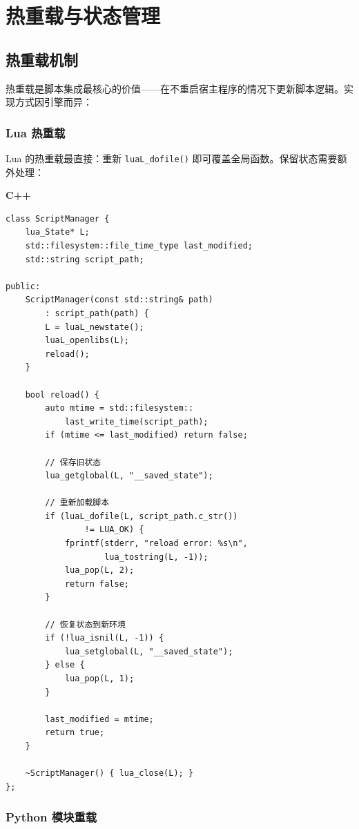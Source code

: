 \documentclass[12pt,a4paper,fontset=fandol]{ctexbook}
\newcommand{\Fn}[1]{\texttt{#1()}}
\newcommand{\cpplabel}{%
  \noindent\begin{tcolorbox}[colback=algheadbg,coltext=white,
    sharp corners,boxrule=0pt,width=3.0em,height=1.4em,
    halign=center,valign=center,nobeforeafter,left=0pt,right=0pt,
    top=0pt,bottom=0pt]\small\bfseries C++\end{tcolorbox}}
\begin{document}
\chapter{热重载与状态管理}\label{ch:hot-reload}

\section{热重载机制}\label{sec:hot-reload}

热重载是脚本集成最核心的价值——在不重启宿主程序的情况下更新脚本逻辑。实现方式因引擎而异：

\subsection{Lua 热重载}\label{sec:lua-hot-reload}

Lua 的热重载最直接：重新 \Fn{luaL\_dofile} 即可覆盖全局函数。保留状态需要额外处理：

\cpplabel
\begin{lstlisting}[style=cppstyle]
class ScriptManager {
    lua_State* L;
    std::filesystem::file_time_type last_modified;
    std::string script_path;

public:
    ScriptManager(const std::string& path)
        : script_path(path) {
        L = luaL_newstate();
        luaL_openlibs(L);
        reload();
    }

    bool reload() {
        auto mtime = std::filesystem::
            last_write_time(script_path);
        if (mtime <= last_modified) return false;

        // 保存旧状态
        lua_getglobal(L, "__saved_state");

        // 重新加载脚本
        if (luaL_dofile(L, script_path.c_str())
                != LUA_OK) {
            fprintf(stderr, "reload error: %s\n",
                    lua_tostring(L, -1));
            lua_pop(L, 2);
            return false;
        }

        // 恢复状态到新环境
        if (!lua_isnil(L, -1)) {
            lua_setglobal(L, "__saved_state");
        } else {
            lua_pop(L, 1);
        }

        last_modified = mtime;
        return true;
    }

    ~ScriptManager() { lua_close(L); }
};
\end{lstlisting}

\subsection{Python 模块重载}\label{sec:python-hot-reload}
\end{document}
